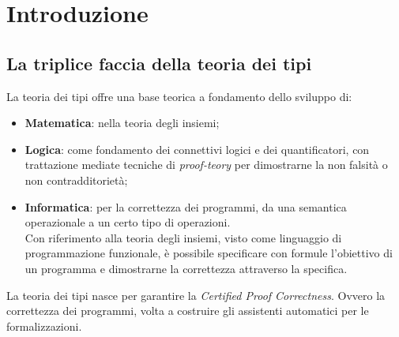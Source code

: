 \chapter{Introduzione}
\label{cap:introduzione}
\section{La triplice faccia della teoria dei tipi}
\label{sec:la-triplice-faccia}
La teoria dei tipi offre una base teorica a fondamento dello sviluppo di:
\begin{itemize}
\item \textbf{Matematica}: nella teoria degli insiemi;
\item \textbf{Logica}: come fondamento dei connettivi logici e dei quantificatori, con trattazione mediate tecniche di \textit{proof-teory} per dimostrarne la non falsit\`a o non contradditoriet\`a;
\item \textbf{Informatica}: per la correttezza dei programmi, da una semantica operazionale a un certo tipo di operazioni.\\ 
Con riferimento alla teoria degli insiemi, visto come linguaggio di programmazione funzionale, \`e possibile specificare con formule l'obiettivo di un programma e dimostrarne la correttezza attraverso la specifica.
\end{itemize}
\noindent
La teoria dei tipi nasce per garantire la \textit{Certified Proof Correctness}. Ovvero la correttezza dei programmi, volta a costruire gli assistenti automatici per le formalizzazioni.

